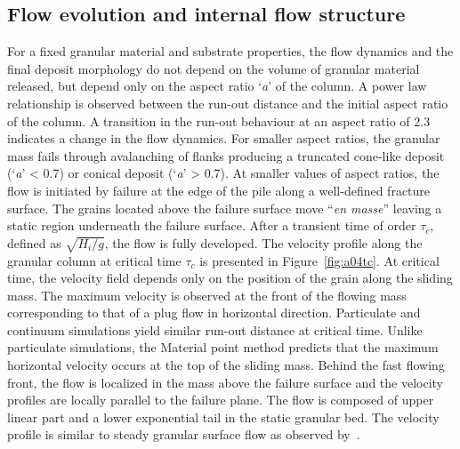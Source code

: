 \subsection{Flow evolution and internal flow structure}
For a fixed granular material and substrate properties, the flow dynamics and 
the final deposit morphology do not depend on the volume of granular material 
released, but depend only on the aspect ratio `\textit{a}' of the column. A 
power law relationship is observed between the run-out distance and the initial 
aspect ratio of the column. A transition in the run-out behaviour at an aspect 
ratio of 2.3 indicates a change in the flow dynamics. For smaller aspect 
ratios, the granular mass fails through avalanching of flanks producing a 
truncated cone-like deposit (`\textit{a}' < 0.7) or conical deposit 
(`\textit{a}' > 0.7). At smaller values of aspect ratios, the flow is initiated 
by failure at the edge of the pile along a well-defined fracture surface. The 
grains located above the failure surface move ``\textit{en masse}'' leaving a 
static region underneath the failure surface. After a transient time of order 
$\tau_{c}$, defined as $\sqrt{H_{\textit{i}}/g}$, the flow is fully developed. 
The velocity profile along the granular column at critical time $\tau_{c}$ is 
presented in Figure~\ref{fig:a04tc}. At critical time, the velocity field 
depends only on the position of the grain along the sliding mass. The maximum 
velocity is observed at the front of the flowing mass corresponding to that of 
a plug flow in horizontal direction. Particulate and continuum simulations 
yield similar run-out distance at critical time. Unlike particulate 
simulations, the Material point method predicts that the maximum horizontal 
velocity occurs at the top of the sliding mass. Behind the fast flowing front, 
the flow is localized in the mass above the failure surface and the velocity 
profiles are locally parallel to the failure plane. The flow is composed of 
upper linear part and a lower exponential tail in the static granular bed. The 
velocity profile is similar to steady granular surface flow as observed 
by~\citet{Lajeunesse2004}. 

